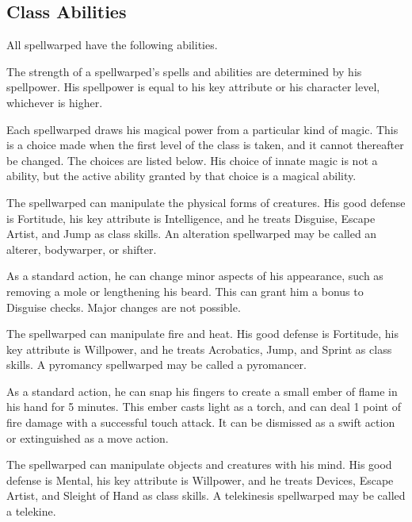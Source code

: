     \subsection{Class Abilities}
        All spellwarped have the following abilities.

        The strength of a spellwarped's spells and abilities are determined by his spellpower.
        His spellpower is equal to his key attribute or his character level, whichever is higher.

        Each spellwarped draws his magical power from a particular kind of magic.
        This is a choice made when the first level of the class is taken, and it cannot thereafter be changed.
        The choices are listed below.
        His choice of innate magic is not a  ability, but the active ability granted by that choice is a magical ability.

        The spellwarped can manipulate the physical forms of creatures.
        His good defense is Fortitude, his key attribute is Intelligence, and he treats Disguise, Escape Artist, and Jump as class skills.
        An alteration spellwarped may be called an alterer, bodywarper, or shifter.

        As a standard action, he can change minor aspects of his appearance, such as removing a mole or lengthening his beard.
        This can grant him a  bonus to Disguise checks.
        Major changes are not possible.

        The spellwarped can manipulate fire and heat.
        His good defense is Fortitude, his key attribute is Willpower, and he treats Acrobatics, Jump, and Sprint as class skills.
        A pyromancy spellwarped may be called a pyromancer.

        As a standard action, he can snap his fingers to create a small ember of flame in his hand for 5 minutes.
        This ember casts light as a torch, and can deal 1 point of fire damage with a successful touch attack.
        It can be dismissed as a swift action or extinguished as a move action.

        The spellwarped can manipulate objects and creatures with his mind.
        His good defense is Mental, his key attribute is Willpower, and he treats Devices, Escape Artist, and Sleight of Hand as class skills.
        A telekinesis spellwarped may be called a telekine.

